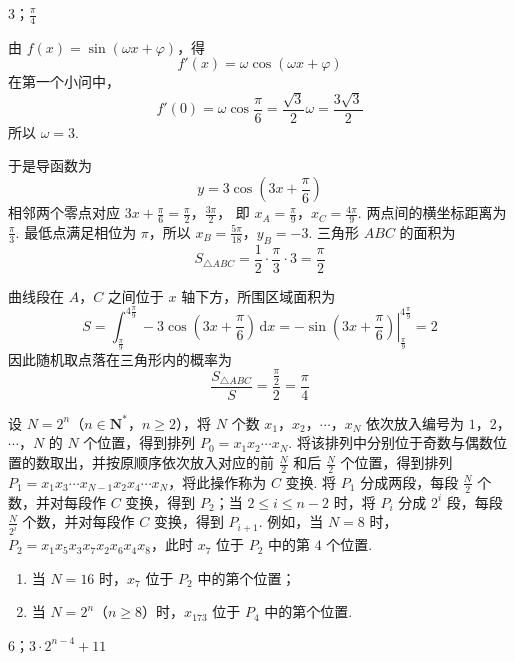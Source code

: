 \begin{answer}
\(3\)；\(\frac{\pi}{4}\)
\end{answer}

\begin{solution}
由 \(f(x)=\sin(\omega x+\varphi)\)，得
\[
f'(x)=\omega\cos(\omega x+\varphi)
\]
在第一个小问中，
\[
f'(0)=\omega\cos\frac\pi6=\frac{\sqrt3}{2}\omega=\frac{3\sqrt3}{2}
\]
所以 \(\omega=3\).

于是导函数为
\[
y=3\cos\left(3x+\frac\pi6\right)
\]
相邻两个零点对应
\(3x+\frac\pi6=\frac\pi2\)，\(\frac{3\pi}{2}\)，
即 \(x_A=\frac\pi9\)，\(x_C=\frac{4\pi}{9}\). 两点间的横坐标距离为 \(\frac\pi3\). 最低点满足相位为 \(\pi\)，所以
\(x_B=\frac{5\pi}{18}\)，\(y_B=-3\).
三角形 \(ABC\) 的面积为
\[
S_{\triangle ABC}=\frac12\cdot\frac\pi3\cdot3=\frac\pi2
\]

曲线段在 \(A\)，\(C\) 之间位于 \(x\) 轴下方，所围区域面积为
\[
S=\int_{\frac{\pi}{9}}^{4\frac{\pi}{9}}-3\cos\left(3x+\frac\pi6\right)\,\mathrm dx
{}=-\left.\sin\left(3x+\frac\pi6\right)\right|_{\frac{\pi}{9}}^{4\frac{\pi}{9}}=2
\]
因此随机取点落在三角形内的概率为
\[
\frac{S_{\triangle ABC}}{S}=\frac{\frac{\pi}{2}}{2}=\frac\pi4
\]
\end{solution}

\begin{problem}
设 \(N=2^n\)（\(n\in\mathbf{N}^*\)，\(n\geqslant2\)），将 \(N\) 个数 \(x_1\)，\(x_2\)，\(\cdots\)，\(x_N\) 依次放入编号为 \(1\)，\(2\)，\(\cdots\)，\(N\) 的 \(N\) 个位置，得到排列 \(P_0=x_1x_2\cdots x_N\). 将该排列中分别位于奇数与偶数位置的数取出，并按原顺序依次放入对应的前 \(\frac{N}{2}\) 和后 \(\frac{N}{2}\) 个位置，得到排列 \(P_1=x_1x_3\cdots x_{N-1}x_2x_4\cdots x_N\)，将此操作称为 \(C\) 变换. 将 \(P_1\) 分成两段，每段 \(\frac{N}{2}\) 个数，并对每段作 \(C\) 变换，得到 \(P_2\)；当 \(2\leqslant i\leqslant n-2\) 时，将 \(P_i\) 分成 \(2^i\) 段，每段 \(\frac{N}{2^i}\) 个数，并对每段作 \(C\) 变换，得到 \(P_{i+1}\). 例如，当 \(N=8\) 时，\(P_2=x_1x_5x_3x_7x_2x_6x_4x_8\)，此时 \(x_7\) 位于 \(P_2\) 中的第 \(4\) 个位置.

\begin{enumerate}
\item 当 \(N=16\) 时，\(x_7\) 位于 \(P_2\) 中的第\fillinblank{}个位置；
\item 当 \(N=2^n\)（\(n\geqslant8\)）时，\(x_{173}\) 位于 \(P_4\) 中的第\fillinblank{}个位置.
\end{enumerate}
\end{problem}

\begin{answer}
\(6\)；\(3\cdot 2^{n-4}+11\)
\end{answer}

